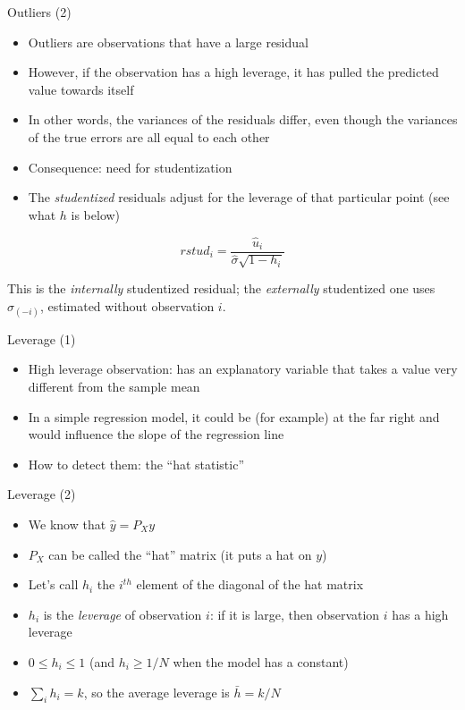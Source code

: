 \documentclass[aspectratio=169]{beamer}
\begin{document}
\begin{frame}{Outliers (2)}
\begin{itemize}
    \item Outliers are observations that have a large residual
    \item However, if the observation has a high leverage, it has pulled the predicted value towards itself
    \item In other words, the variances of the residuals differ, even though the variances of the true errors are all equal to each other
    \item Consequence: need for studentization
    \item The \textit{studentized} residuals adjust for the leverage of that particular point (see what $h$ is below)
\end{itemize}

\[rstud_i = \frac{\hat{u}_i}{\hat{\sigma}\sqrt{1 - h_i}}\]

This is the \textit{internally} studentized residual; the \textit{externally} studentized one uses $\hat{\sigma}_{(-i)}$, estimated without observation $i$.
\end{frame}

\begin{frame}{Leverage (1)}
\begin{itemize}
    \item High leverage observation: has an explanatory variable that takes a value very different from the sample mean
    \item In a simple regression model, it could be (for example) at the far right and would influence the slope of the regression line
    \item How to detect them: the ``hat statistic''
\end{itemize}
\end{frame}

\begin{frame}{Leverage (2)}
\begin{itemize}
    \item We know that $\hat{y} = P_Xy$
    \item $P_X$ can be called the ``hat'' matrix (it puts a hat on $y$)
    \item Let's call $h_i$ the $i^{th}$ element of the diagonal of the hat matrix
    \item $h_i$ is the \textit{leverage} of observation $i$: if it is large, then observation $i$ has a high leverage
    \item $0 \leq h_i \leq 1$ (and $h_i \geq 1/N$ when the model has a constant)
    \item $\sum_i h_i = k$, so the average leverage is $\bar{h} = k/N$
\end{itemize}
\end{frame}
\end{document}
